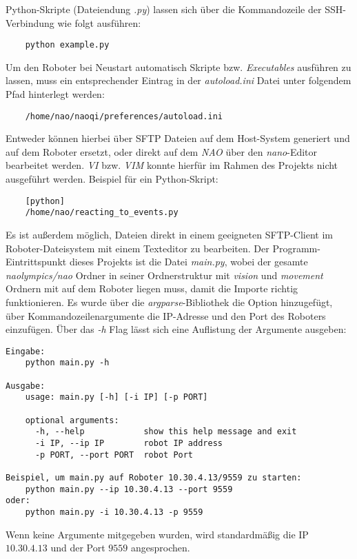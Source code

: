 Python-Skripte (Dateiendung \textit{.py}) lassen sich über die Kommandozeile der SSH-Verbindung wie folgt ausführen:

\begin{verbatim}
    python example.py
\end{verbatim}

Um den Roboter bei Neustart automatisch Skripte bzw. \textit{Executables} ausführen zu lassen, muss ein entsprechender Eintrag in der \textit{autoload.ini} Datei unter folgendem Pfad hinterlegt werden\cite{autoload_skripts}:

\begin{verbatim}
    /home/nao/naoqi/preferences/autoload.ini
\end{verbatim}

Entweder können hierbei über SFTP Dateien auf dem Host-System generiert und auf dem Roboter ersetzt, oder direkt auf dem \textit{NAO} über den \textit{nano}-Editor bearbeitet werden. \textit{VI} bzw. \textit{VIM} konnte hierfür im Rahmen des Projekts nicht ausgeführt werden. Beispiel für ein Python-Skript:

\begin{verbatim}
    [python]
    /home/nao/reacting_to_events.py
\end{verbatim}

Es ist außerdem möglich, Dateien direkt in einem geeigneten SFTP-Client im Roboter-Dateisystem mit einem Texteditor zu bearbeiten. Der Programm-Eintrittspunkt dieses Projekts ist die Datei \textit{main.py}, wobei der gesamte \textit{naolympics/nao} Ordner in seiner Ordnerstruktur mit \textit{vision} und \textit{movement} Ordnern mit auf dem Roboter liegen muss, damit die Importe richtig funktionieren. Es wurde über die \textit{argparse}-Bibliothek die Option hinzugefügt, über Kommandozeilenargumente die IP-Adresse und den Port des Roboters einzufügen. Über das \textit{-h} Flag lässt sich eine Auflistung der Argumente ausgeben:

\begin{verbatim}
Eingabe: 
    python main.py -h

Ausgabe:
    usage: main.py [-h] [-i IP] [-p PORT]
    
    optional arguments:
      -h, --help            show this help message and exit
      -i IP, --ip IP        robot IP address
      -p PORT, --port PORT  robot Port

Beispiel, um main.py auf Roboter 10.30.4.13/9559 zu starten:
    python main.py --ip 10.30.4.13 --port 9559
oder:
    python main.py -i 10.30.4.13 -p 9559
\end{verbatim}

Wenn keine Argumente mitgegeben wurden, wird standardmäßig die IP $10.30.4.13$ und der Port $9559$ angesprochen.
